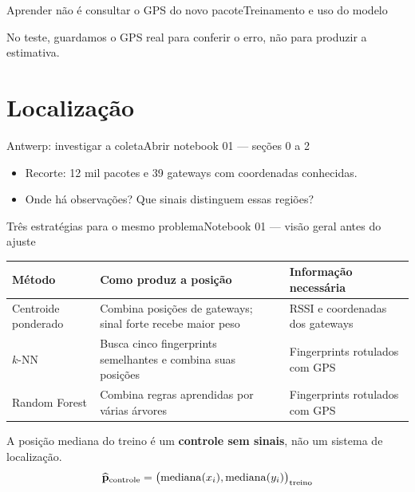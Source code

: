 \begin{frame}{Aprender não é consultar o GPS do novo pacote}{Treinamento e uso do modelo}
\centering
{}
\par\vspace{3mm}
No teste, guardamos o GPS real para conferir o erro, não para produzir a estimativa.
\end{frame}

\section{Localização}
\begin{frame}{Antwerp: investigar a coleta}{Abrir notebook 01 — seções 0 a 2}
\begin{itemize}
\item Recorte: 12 mil pacotes e 39 gateways com coordenadas conhecidas.
\item Onde há observações? Que sinais distinguem essas regiões?
\end{itemize}
\end{frame}

\begin{frame}{Três estratégias para o mesmo problema}{Notebook 01 — visão geral antes do ajuste}
\small
\begin{tabular}{p{2.5cm}p{5.3cm}p{4.2cm}}
\toprule
Método & Como produz a posição & Informação necessária\\
\midrule
Centroide ponderado & Combina posições de gateways; sinal forte recebe maior peso & RSSI e coordenadas dos gateways\\[2mm]
$k$-NN & Busca cinco fingerprints semelhantes e combina suas posições & Fingerprints rotulados com GPS\\[2mm]
Random Forest & Combina regras aprendidas por várias árvores & Fingerprints rotulados com GPS\\
\bottomrule
\end{tabular}
\vspace{3mm}
A posição mediana do treino é um \textbf{controle sem sinais}, não um sistema de localização.
\[
\widehat{\mathbf p}_{\rm controle}
=\bigl(\operatorname{mediana}(x_i),\operatorname{mediana}(y_i)\bigr)_{\rm treino}
\]
\end{frame}

